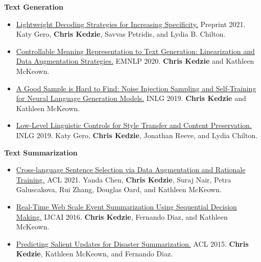 \documentclass[letterpaper,11pt]{article}
\begin{document}
\textbf{Text Generation}\\

\begin{itemize}[leftmargin=6.0mm]
\item \href{https://arxiv.org/pdf/2110.11850.pdf}{Lightweight Decoding Strategies for Increasing Specificity.} Preprint 2021.
Katy Gero, \textbf{Chris Kedzie}, Savvas Petridis, and Lydia B. Chilton.

\item \href{http://www.cs.columbia.edu/~kedzie/cmrttg.pdf}{Controllable Meaning Representation to Text Generation: Linearization and Data Augmentation Strategies.} EMNLP 2020.
\textbf{Chris Kedzie} and Kathleen McKeown.

\item \href{https://www.aclweb.org/anthology/W19-8672.pdf}{A Good Sample is Hard to Find: Noise Injection Sampling and Self-Training for Neural Language Generation Models.} INLG 2019.
    \textbf{Chris Kedzie} and Kathleen McKeown. \color{Maroon}{Best Paper Award.}


\item \href{https://www.aclweb.org/anthology/W19-8628.pdf}{Low-Level Linguistic Controls for Style Transfer and Content Preservation.} INLG 2019.
Katy Gero, \textbf{Chris Kedzie}, Jonathan Reeve, and Lydia Chilton.

\end{itemize}

\textbf{Text Summarization} \\

\begin{itemize}[leftmargin=6.0mm]
\item \href{https://aclanthology.org/2021.acl-long.300.pdf}{Cross-language Sentence Selection via Data Augmentation and Rationale Training.} ACL 2021.
Yanda Chen, \textbf{Chris Kedzie}, Suraj Nair, Petra Galuscakova, Rui Zhang, Douglas Oard, and Kathleen McKeown.

\item \href{https://www.ijcai.org/Proceedings/16/Papers/528.pdf}{Real-Time Web Scale Event Summarization Using Sequential Decision Making.} IJCAI 2016.
\textbf{Chris Kedzie}, Fernando Diaz, and Kathleen McKeown.


\item \href{https://www.aclweb.org/anthology/P15-1155.pdf}{Predicting Salient Updates for Disaster Summarization.} ACL 2015.
\textbf{Chris Kedzie}, Kathleen McKeown, and Fernando Diaz.

\end{itemize}
\end{document}
